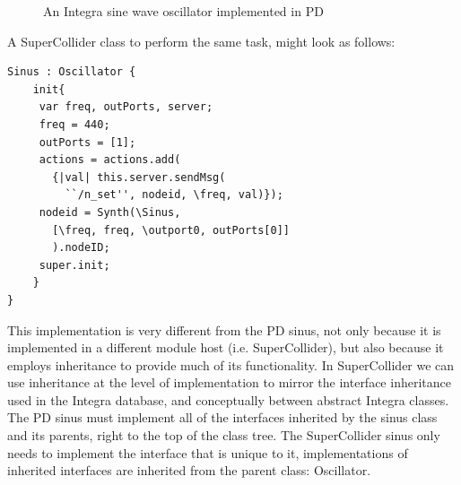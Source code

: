 \documentclass{article}
\begin{document}
\begin{figure}
\centerline{}
\caption{An Integra sine wave oscillator implemented in PD}
\label{fig:sinus}
\end{figure}

A SuperCollider class to perform the same task, might look as follows:

{\small
\begin{verbatim}
Sinus : Oscillator {
    init{
     var freq, outPorts, server;
     freq = 440;
     outPorts = [1];
     actions = actions.add(
       {|val| this.server.sendMsg(
         ``/n_set'', nodeid, \freq, val)});
     nodeid = Synth(\Sinus, 
       [\freq, freq, \outport0, outPorts[0]]
       ).nodeID;
     super.init;
    }
}
\end{verbatim}
}

This implementation is very different from the PD sinus, not only because it is implemented in a different module host (i.e. SuperCollider), but also because it employs inheritance to provide much of its functionality. In SuperCollider we can use inheritance at the level of implementation to mirror the interface inheritance used in the Integra database, and conceptually between abstract Integra classes. The PD sinus must implement all of the interfaces inherited by the sinus class and its parents, right to the top of the class tree. The SuperCollider sinus only needs to implement the interface that is unique to it, implementations of inherited interfaces are inherited from the parent class: Oscillator. 
\end{document}

